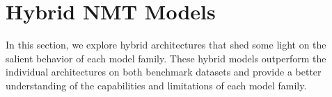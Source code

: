 \documentclass[11pt,a4paper]{article}
\begin{document}
%
%

\section{Hybrid NMT Models}
\label{sec:hybrids}
\vspace{-5px}
In this section, we explore hybrid architectures that shed
some light on the salient behavior of each model family. These hybrid models
outperform the individual architectures on both benchmark datasets and provide
a better understanding of the capabilities and limitations of each model family.

\end{document}
